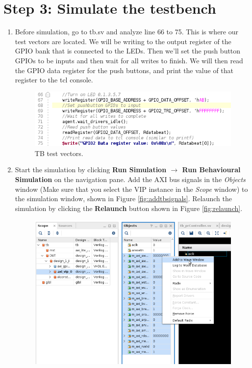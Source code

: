 \documentclass[11pt]{article}
\begin{document}
\section*{Step 3: Simulate the testbench}
\begin{enumerate}
	\item Before simulation, go to tb.sv and analyze line 66 to 75. This is where our test vectors are located. We will be writing to the output register of the GPIO bank that is connected to the LEDs. Then we'll set the push button GPIOs to be inputs and then wait for all writes to finish. We will then read the GPIO data register for the push buttons, and print the value of that register to the tcl console.
		\begin{figure}[H]
		  \centering
		  \includegraphics[scale=0.5]{tbanalysis.png}
		  \caption{TB test vectors.}
		  \label{fig:tbanalysis}
		\end{figure} 
	\item  Start the simulation by clicking \textbf{Run Simulation $\rightarrow$ Run Behavioural Simulation} on the navigation pane. Add the AXI bus signals in the \textit{Objects} window (Make sure that you select the VIP instance in the \textit{Scope} window) to the simulation window, shown in Figure \ref{fig:addtbsignals}. Relaunch the simulation by clicking the \textbf{Relaunch} button shown in Figure \ref{fig:relaunch}.
		\begin{figure}[H]
		  \centering
		  \includegraphics[scale=0.5]{addtbsignals.png}

\end{figure}
\end{enumerate}
\end{document}
